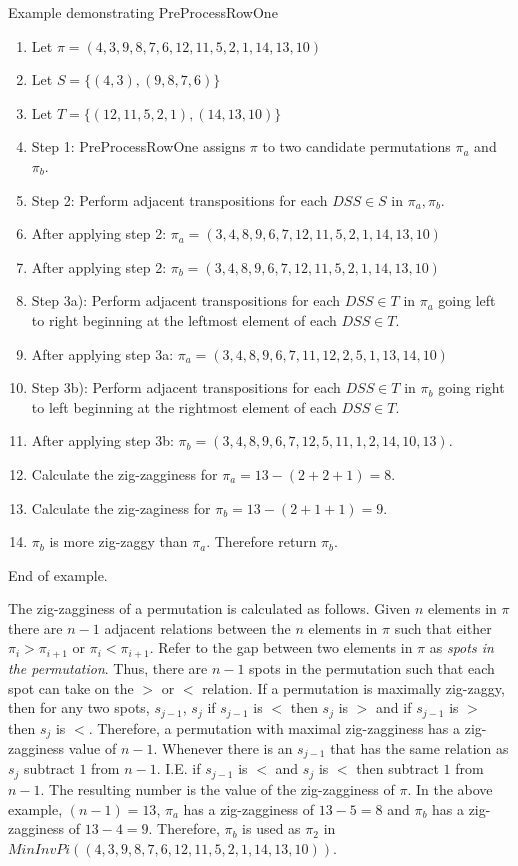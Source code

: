 \begin{example} 
    Example demonstrating {\sc PreProcessRowOne}
    \begin{enumerate}
        \item Let  $\pi=(4,3,9,8,7,6,12,11,5,2,1,14,13,10)$
        \item Let $S=\{(4,3),(9,8,7,6)\}$
        \item Let $T=\{(12,11,5,2,1),(14,13,10)\}$
        \item Step 1: {\sc PreProcessRowOne} assigns $\pi$ to two candidate permutations $\pi_{a}$ and $\pi_{b}$.
        \item Step 2: Perform adjacent transpositions for each $DSS \in S$ in $\pi_{a},\pi_{b}$.
        \item After applying step 2: $\pi_{a}=(3,4,8,9,6,7,12,11,5,2,1,14,13,10)$ 
        \item After applying step 2: $\pi_{b}=(3,4,8,9,6,7,12,11,5,2,1,14,13,10)$ 
        \item Step 3a): Perform adjacent transpositions for each $DSS \in T$ in $\pi_{a}$ going left 
        to right beginning at the leftmost element of each $DSS \in T$.
        \item After applying step 3a: $\pi_{a}=(3,4,8,9,6,7,11,12,2,5,1,13,14,10)$
        \item Step 3b): Perform adjacent transpositions for each $DSS \in T$ in $\pi_{b}$ going right 
        to left beginning at the rightmost element of each $DSS \in T$.
        \item After applying step 3b: $\pi_{b}=(3,4,8,9,6,7,12,5,11,1,2,14,10,13)$.
        \item Calculate the zig-zagginess for $\pi_{a}=13-(2+2+1)=8$.
        \item Calculate the zig-zaginess for $\pi_{b}=13-(2+1+1)=9$.
        \item $\pi_{b}$ is more zig-zaggy than $\pi_{a}$. Therefore return $\pi_{b}$.
    \end{enumerate}
    End of example.
    \label{Example:PreProcessRowOne}
\end{example}

The zig-zagginess of a permutation is calculated as follows. Given $n$ elements in $\pi$ there 
are $n-1$ adjacent relations between the $n$ elements in $\pi$ such that either $\pi_{i}>\pi_{i+1}$
or $\pi_{i}<\pi_{i+1}$. Refer to the gap between two elements in $\pi$ as \emph{spots in the permutation}. Thus, 
there are $n-1$ spots in the permutation such that each spot can take on the $>$ or $<$ relation. 
If a permutation is maximally zig-zaggy, then for any two spots, $s_{j-1}$, $s_{j}$
if $s_{j-1}$ is $<$ then $s_{j}$ is $>$ and if $s_{j-1}$ is $>$ then $s_{j}$ is $<$.
Therefore, a permutation with maximal zig-zagginess has a zig-zagginess value of $n-1$.
Whenever there is an $s_{j-1}$ that has the same relation as $s_{j}$ subtract $1$ from 
$n-1$. I.E. if $s_{j-1}$ is $<$ and $s_{j}$ is $<$ then subtract $1$ from $n-1$. The resulting 
number is the value of the zig-zagginess of $\pi$. In the above example, $(n-1)=13$, 
$\pi_{a}$ has a zig-zagginess of $13-5=8$ and $\pi_{b}$ has a zig-zagginess of $13-4=9$. 
Therefore, $\pi_{b}$ is used as $\pi_{2}$ in $MinInvPi((4,3,9,8,7,6,12,11,5,2,1,14,13,10))$.

